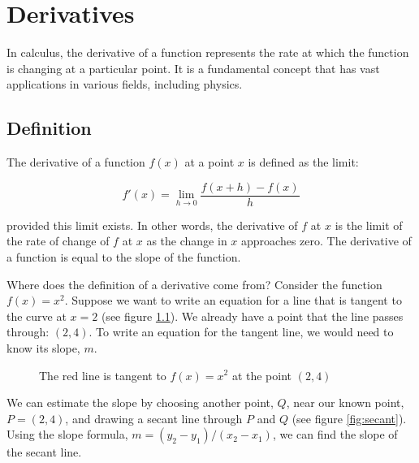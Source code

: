 \chapter{Derivatives}

In calculus, the derivative of a function represents the rate at which the 
function is changing at a particular point. It is a fundamental concept that 
has vast applications in various fields, including physics.

\section{Definition}

The derivative of a function $f(x)$ at a point $x$ is defined as the limit:

\begin{equation}
f'(x) = \lim_{{h \to 0}} \frac{f(x+h) - f(x)}{h}
\end{equation}

provided this limit exists. In other words, the derivative of $f$ at $x$ is the 
limit of the rate of change of $f$ at $x$ as the change in $x$ approaches zero. 
The derivative of a function is equal to the slope  of the function. 

Where does the definition of a derivative come from? Consider the function 
$f(x) = x^2$. Suppose we want to write an equation for a line that is tangent 
to the curve at $x = 2$ (see figure \ref{fig:tangent}). We already have a 
point that the line passes through: $(2, 4)$. To write an equation for the 
tangent line, we would need to know its slope, $m$. 

\begin{figure}[htbp]
    \centering
    \caption{The red line is tangent to $f(x) = x^2$ at the point $(2, 4)$}
    \label{fig:tangent}
\end{figure}

We can estimate the slope by choosing another point, $Q$, near our known 
point, $P = (2, 4)$, and drawing a secant line through $P$ and $Q$ (see figure 
\ref{fig:secant}). Using the slope formula, $m = \left( y_2 - y_1 \right) / 
\left( x_2 - x_1 \right)$, we can find the slope of the secant line. 

